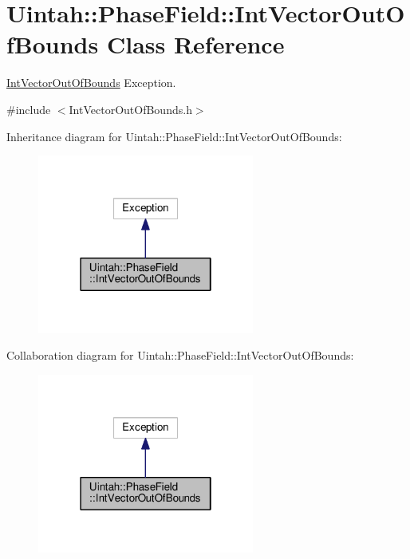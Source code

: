 \hypertarget{classUintah_1_1PhaseField_1_1IntVectorOutOfBounds}{}\section{Uintah\+:\+:Phase\+Field\+:\+:Int\+Vector\+Out\+Of\+Bounds Class Reference}
\label{classUintah_1_1PhaseField_1_1IntVectorOutOfBounds}


\hyperlink{classUintah_1_1PhaseField_1_1IntVectorOutOfBounds}{Int\+Vector\+Out\+Of\+Bounds} Exception.  




{\ttfamily \#include $<$Int\+Vector\+Out\+Of\+Bounds.\+h$>$}



Inheritance diagram for Uintah\+:\+:Phase\+Field\+:\+:Int\+Vector\+Out\+Of\+Bounds\+:\nopagebreak
\begin{figure}[H]
\begin{center}
\leavevmode
\includegraphics[width=202pt]{classUintah_1_1PhaseField_1_1IntVectorOutOfBounds__inherit__graph}
\end{center}
\end{figure}


Collaboration diagram for Uintah\+:\+:Phase\+Field\+:\+:Int\+Vector\+Out\+Of\+Bounds\+:\nopagebreak
\begin{figure}[H]
\begin{center}
\leavevmode
\includegraphics[width=202pt]{classUintah_1_1PhaseField_1_1IntVectorOutOfBounds__coll__graph}
\end{center}
\end{figure}
